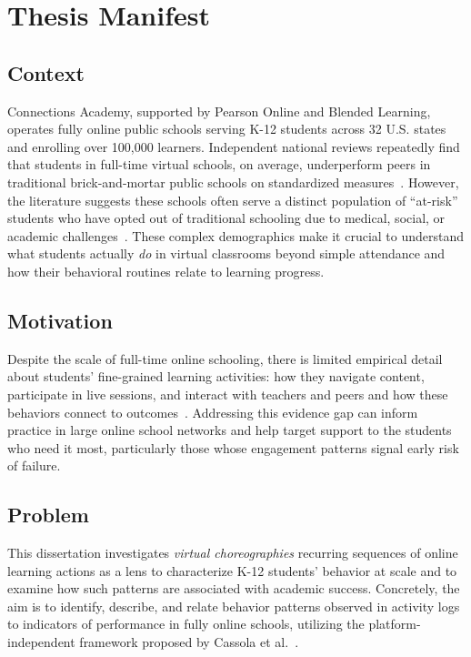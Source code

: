 \chapter{Thesis Manifest}
\label{chap:manifest}


\section{Context} \label{sec:context}
Connections Academy, supported by Pearson Online and Blended Learning, operates fully online public schools serving K-12 students across 32 U.S. states and enrolling over 100,000 learners.
Independent national reviews repeatedly find that students in full-time virtual schools, on average, underperform peers in traditional brick-and-mortar public schools on standardized measures~\cite{molnar_virtual_2023}.
However, the literature suggests these schools often serve a distinct population of ``at-risk'' students who have opted out of traditional schooling due to medical, social, or academic challenges~\cite{beck_prepared_2023}.
These complex demographics make it crucial to understand what students actually \emph{do} in virtual classrooms beyond simple attendance and how their behavioral routines relate to learning progress.

\section{Motivation} \label{sec:motivation}
Despite the scale of full-time online schooling, there is limited empirical detail about students' fine-grained learning activities: how they navigate content, participate in live sessions, and interact with teachers and peers and how these behaviors connect to outcomes~\cite{online_johnson_2022}.
Addressing this evidence gap can inform practice in large online school networks and help target support to the students who need it most, particularly those whose engagement patterns signal early risk of failure.

\section{Problem} \label{sec:problem}
This dissertation investigates \emph{virtual choreographies} recurring sequences of online learning actions as a lens to characterize K-12 students' behavior at scale and to examine how such patterns are associated with academic success.
Concretely, the aim is to identify, describe, and relate behavior patterns observed in activity logs to indicators of performance in fully online schools, utilizing the platform-independent framework proposed by Cassola et al.~\cite{cassola_using_2022}.

